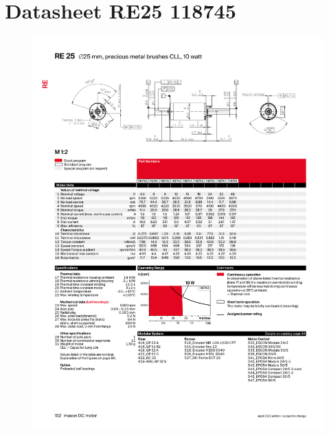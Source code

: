 \documentclass{article}
\begin{document}
  \section{Datasheet RE25 118745}
    \label{app:datasheet motor}
    \begin{figure}[htbp]
      \centering %
      \includegraphics[page=1, clip, trim=0cm 0cm 0cm 0cm, scale = 0.65]{datasheet_RE25118745.pdf}
    \end{figure}
    \cite{Maxon}

  \newpage
\end{document}
